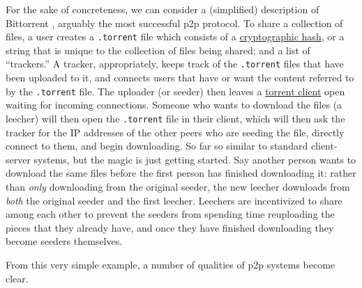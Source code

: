 \documentclass[10pt]{article}
\begin{document}
\begin{multicols}{2}
For the sake of concreteness, we can consider a (simplified) description
of Bittorrent \cite{cohenBitTorrentProtocolSpecification2017} ,
arguably the most successful p2p protocol. To share a collection of
files, a user creates a \texttt{.torrent} file which consists of a
\href{https://en.wikipedia.org/wiki/Cryptographic_hash_function}{cryptographic
hash}, or a string that is unique to the collection of files being
shared; and a list of ``trackers.'' A tracker, appropriately, keeps
track of the \texttt{.torrent} files that have been uploaded to it, and
connects users that have or want the content referred to by the
\texttt{.torrent} file. The uploader (or seeder) then leaves a
\href{https://en.wikipedia.org/wiki/Glossary_of_BitTorrent_terms\#Client}{torrent
client} open waiting for incoming connections. Someone who wants to
download the files (a leecher) will then open the \texttt{.torrent} file
in their client, which will then ask the tracker for the IP addresses of
the other peers who are seeding the file, directly connect to them, and
begin downloading. So far so similar to standard client-server systems,
but the magic is just getting started. Say another person wants to
download the same files before the first person has finished downloading
it: rather than \emph{only} downloading from the original seeder, the
new leecher downloads from \emph{both} the original seeder and the first
leecher. Leechers are incentivized to share among each other to prevent
the seeders from spending time reuploading the pieces that they already
have, and once they have finished downloading they become seeders
themselves.

From this very simple example, a number of qualities of p2p systems
become clear.

\begin{itemize}


\end{itemize}
\end{multicols}
\end{document}
